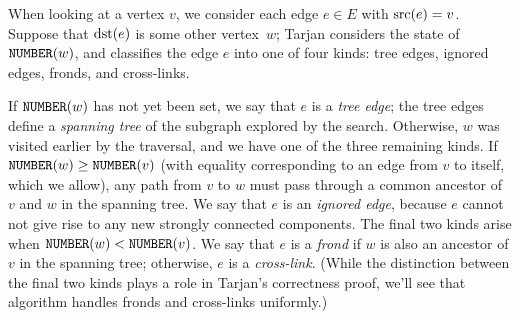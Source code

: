 \documentclass[../generics]{subfiles}
\begin{document}
When looking at a vertex $v$, we consider each edge $e\in E$ with $\operatorname{src}(e)=v$. Suppose that $\operatorname{dst}(e)$ is some other vertex~$w$; Tarjan considers the state of $\texttt{NUMBER}(w)$, and classifies the edge $e$ into one of four kinds: tree edges, ignored edges, fronds, and cross-links.

If $\texttt{NUMBER}(w)$ has not yet been set, we say that $e$ is a \emph{tree edge}; the tree edges define a \emph{spanning tree} of the subgraph explored by the search. Otherwise, $w$ was visited earlier by the traversal, and we have one of the three remaining kinds. If $\texttt{NUMBER}(w)\geq\texttt{NUMBER}(v)$ (with equality corresponding to an edge from $v$ to itself, which we allow), any path from $v$ to $w$ must pass through a common ancestor of $v$ and $w$ in the spanning tree. We say that $e$ is an \emph{ignored edge}, because $e$ cannot not give rise to any new strongly connected components. The final two kinds arise when $\texttt{NUMBER}(w)<\texttt{NUMBER}(v)$. We say that $e$ is a \emph{frond} if $w$ is also an ancestor of $v$ in the spanning tree; otherwise, $e$ is a \emph{cross-link}. (While the distinction between the final two kinds plays a role in Tarjan's correctness proof, we'll see that algorithm handles fronds and cross-links uniformly.)

\begin{wrapfigure}[11]{l}{2.9cm}
\end{wrapfigure}
\end{document}
